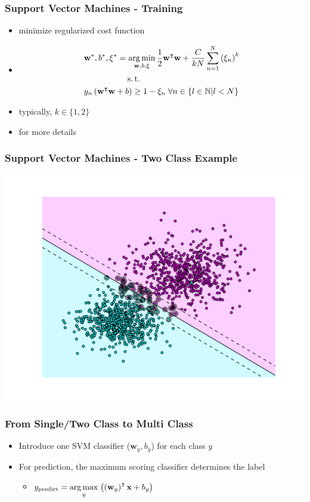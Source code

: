 \begin{frame}
    \frametitle{Support Vector Machines - Training }
    \begin{itemize}
          \item minimize regularized cost function
          \item[] \begin{align}
            &\textbf{w}^*, b^*, \xi^*  = \argmin_{\textbf{w}, b, \xi} \frac{1}{2} \textbf{w}^{\intercal} \textbf{w}
            + \frac{C}{kN}\sum_{n=1}^N\left(\xi_n\right)^k \\
            &\phantom{\textbf{w}^*, b^*, \xi^*  = }\st \nonumber \\ 
            &y_n\left(\textbf{w}^\intercal\textbf{w}+b\right) \geq 1 - \xi_n \; \forall n \in \{l \in
            \mathbb{N} | l < N\}
        \end{align}
          \item typically, $k\in\{1,2\}$
        \item {} for more details
    \end{itemize}
\end{frame}


\begin{frame}
    \frametitle{Support Vector Machines - Two Class Example}
    \includegraphics[width=\textwidth]{images/two_class_svm.pdf}
\end{frame}


\begin{frame}
    \frametitle{From Single/Two Class to Multi Class}
    \begin{itemize}
          \item Introduce one SVM classifier ($\textbf{w}_y, b_y$) for each class $y$
          \item For prediction, the maximum scoring classifier determines the label
        \begin{itemize}
              \item[] $\displaystyle y_{\text{predict}} = \operatorname*{arg\,max}_y \;
            \bigl(\left(\textbf{w}_y\right)^{\intercal}\textbf{x} + b_y\bigr) $
        \end{itemize}
    \end{itemize}
\end{frame}


